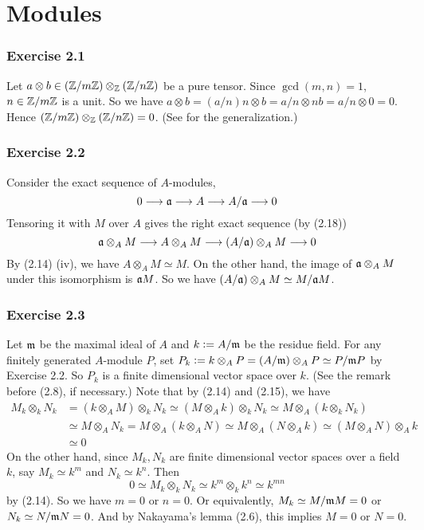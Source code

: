 \documentclass[../A&M.tex]{subfiles}
\begin{document}
\chapter{Modules}

\subsection*{Exercise 2.1}

Let $a \otimes b \in (\mathbb{Z}/m\mathbb{Z}) \otimes_{\mathbb{Z}} (\mathbb{Z}/n\mathbb{Z})$ be a pure tensor. Since $\gcd(m,n)=1$, $n\in \mathbb{Z}/m\mathbb{Z}$ is a unit. So we have $a \otimes b = (a/n)n \otimes b = a/n \otimes nb = a/n \otimes 0 = 0$. Hence $(\mathbb{Z}/m\mathbb{Z}) \otimes_{\mathbb{Z}} (\mathbb{Z}/n\mathbb{Z}) = 0$. (See  for the generalization.)

\subsection*{Exercise 2.2}

Consider the exact sequence of $A$-modules,
$$
0 \longrightarrow \mathfrak{a} \longrightarrow A \longrightarrow A/\mathfrak{a} \longrightarrow 0
$$
Tensoring it with $M$ over $A$ gives the right exact sequence (by (2.18))
$$
\mathfrak{a} \otimes_A M \longrightarrow A \otimes_A M \longrightarrow (A/\mathfrak{a}) \otimes_A M \longrightarrow 0
$$
By (2.14) (iv), we have $A \otimes_A M \simeq M$. On the other hand, the image of $\mathfrak{a} \otimes_A M$ under this isomorphism is $\mathfrak{a} M$. So we have $(A/\mathfrak{a}) \otimes_A M \simeq M/\mathfrak{a} M$.

\subsection*{Exercise 2.3}

Let $\mathfrak{m}$ be the maximal ideal of $A$ and $k:=A/\mathfrak{m}$ be the residue field. For any finitely generated $A$-module $P$, set $P_k := k \otimes_A P = (A/\mathfrak{m}) \otimes_A P \simeq P/\mathfrak{m} P$ by Exercise 2.2. So $P_k$ is a finite dimensional vector space over $k$. (See the remark before (2.8), if necessary.) Note that by (2.14) and (2.15), we have
\begin{align*}
	M_k \otimes_k N_k
	&= (k \otimes_A M) \otimes_k N_k
	\simeq (M \otimes_A k) \otimes_k N_k
	\simeq M \otimes_A (k \otimes_k N_k)     \\
	&\simeq M \otimes_A N_k
	= M \otimes_A (k \otimes_A N)
	\simeq M \otimes_A (N \otimes_A k)
	\simeq (M \otimes_A N) \otimes_A k    \\
	&\simeq 0	
\end{align*}
On the other hand, since $M_k,N_k$ are finite dimensional vector spaces over a field $k$, say $M_k \simeq k^m$ and $N_k\simeq k^n$. Then
$$
0 \simeq M_k \otimes_k N_k \simeq k^m \otimes_k k^n \simeq k^{mn}
$$
by (2.14). So we have $m=0$ or $n=0$. Or equivalently, $M_k \simeq M/\mathfrak{m} M = 0$ or $N_k \simeq N/\mathfrak{m} N = 0$. And by Nakayama's lemma (2.6), this implies $M=0$ or $N=0$.
\end{document}

